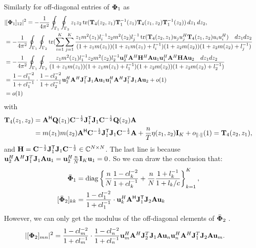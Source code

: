 \documentclass[11pt,a4paper]{article}
\begin{document}
Similarly for off-diagonal entries of ${\boldsymbol{\Phi}}_1$ as
\begin{align*}
	&|[{\boldsymbol{\Phi}}_1]_{12}|^2 = -\frac1{4 \pi^2} \oint_{\Gamma_1} \oint_{\Gamma_2} z_1 z_2 \operatorname{tr} ( \mathbf{T}_4 (z_2,z_1) \mathbf{T}_1^{-1}(z_1) \mathbf{T}_4(z_1,z_2) 
 \mathbf{T}_1^{-1}(z_2) )\,dz_1\,dz_2, \\ 
	&= -\frac1{4 \pi^2} \oint_{\Gamma_1} \oint_{\Gamma_2} \operatorname{tr}( \sum_{i=1}^K \sum_{j=1}^K \frac{z_1 m^2(z_1) l_i^{-1} z_2 m^2(z_2)l_j^{-1} \operatorname{tr}(\mathbf{T}_4 (z_2,z_1) u_j u_j^H\mathbf{T}_4 (z_1,z_2) u_i u_i^H) \quad dz_1 dz_2 }{(1+z_1m(z_1))(1+z_1m(z_1)+l_i^{-1})(1+z_2m(z_2))(1+z_2m(z_2)+l_j^{-1})} \\
    &= -\frac1{4 \pi^2} \oint_{\Gamma_1} \oint_{\Gamma_2} \frac{z_1 m^2(z_1) l_1^{-1} z_2 m^2(z_2) l_2^{-1}  \mathbf{u}_2^H {\mathbf{A}}^H \mathbf{H}^H {\mathbf{A}} \mathbf{u}_1 \mathbf{u}_1^H {\mathbf{A}}^H \mathbf{H} {\mathbf{A}} \mathbf{u}_2 \quad dz_1 dz_2}{(1+z_1m(z_1))(1+z_1m(z_1)+l_1^{-1})(1+z_2m(z_2))(1+z_2m(z_2)+l_2^{-1})} \\
     &= \frac{1- c l_1^{-2}}{ 1 + c l_1^{-1} } \cdot \frac{1- c l_2^{-2}}{ 1 + c l_2^{-1} }  \mathbf{u}_2^H {\mathbf{A}}^H {\mathbf{J}}_1^T {\mathbf{J}}_1 {\mathbf{A}} \mathbf{u}_1 \mathbf{u}_1^H {\mathbf{A}}^H {\mathbf{J}}_1^T {\mathbf{J}}_1 {\mathbf{A}} \mathbf{u}_2 + o(1) \\
     &= o(1)
\end{align*}
with
\begin{align*}
	\mathbf{T}_4(z_1, z_2) &= {\mathbf{A}}^{\sf H} {\mathbf{Q}}(z_1) {\mathbf{C}}^{-\frac12} {\mathbf{J}}_1^{\sf T} {\mathbf{J}}_1 {\mathbf{C}}^{-\frac12} {\mathbf{Q}}(z_2) {\mathbf{A}} \\ 
	&= m(z_1) m(z_2) {\mathbf{A}}^{\sf H} {\mathbf{C}}^{-\frac12} {\mathbf{J}}_1^{\sf T} {\mathbf{J}}_1 {\mathbf{C}}^{-\frac12} {\mathbf{A}} + \frac{n}T \eta(z_1, z_2) \mathbf{I}_K + o_{\| \cdot \|}(1) = \mathbf{T}_4(z_2, z_1),
\end{align*}
and $\mathbf{H} = {\mathbf{C}}^{-\frac12} {\mathbf{J}}_1^{\sf T} {\mathbf{J}}_1 {\mathbf{C}}^{-\frac12} \in {\mathbb{C}}^{N \times N}$.
The last line is because $ \mathbf{u}_2^H {\mathbf{A}}^H {\mathbf{J}}_1^T {\mathbf{J}}_1 {\mathbf{A}} \mathbf{u}_1 = \mathbf{u}_2^H \frac{n}N \mathbf{I}_K \mathbf{u}_1 = 0$.
So we can draw the conclusion that:
\begin{align}
	\bar{\bPhi}_1 &= \diag \left\{ \frac{n}N \frac{1- c l_k^{-2}}{ 1 + c l_k^{-1} }  + \frac{n}N \frac{ 1 + l_k^{-1} }{1+l_k/c} \right\}_{k=1}^K, \\
	[\bar{\bPhi}_2]_{kk} &= \frac{1- c l_1^{-2}}{ 1 + c l_1^{-1} } \cdot \uu_k^H \A^\H \J_1^\T \J_2 \A \uu_k 
\end{align}
However, we can only get the modulus of the off-diagonal elements of $\bar{{\boldsymbol{\Phi}}}_2$ .
\begin{align*}
	&|[{\boldsymbol{\Phi}}_2]_{mn}|^2 = \frac{1- c l_m^{-2}}{ 1 + c l_m^{-1} } \cdot \frac{1- c l_n^{-2}}{ 1 + c l_n^{-1} }  \mathbf{u}_m^H {\mathbf{A}}^H {\mathbf{J}}_2^T {\mathbf{J}}_1 {\mathbf{A}} \mathbf{u}_n \mathbf{u}_n^H {\mathbf{A}}^H {\mathbf{J}}_1^T {\mathbf{J}}_2 {\mathbf{A}} \mathbf{u}_m.
\end{align*}
\end{document}
